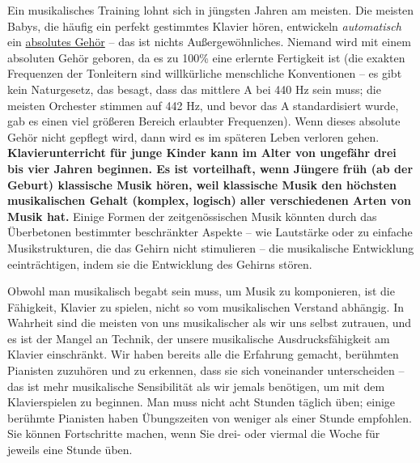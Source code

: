 Ein musikalisches Training lohnt sich in jüngsten Jahren am meisten.
Die meisten Babys, die häufig ein perfekt gestimmtes Klavier hören, entwickeln \textit{automatisch} ein \hyperref[c1iii12]{absolutes Gehör} -- das ist nichts Außergewöhnliches.
Niemand wird mit einem absoluten Gehör geboren, da es zu 100\% eine erlernte Fertigkeit ist (die exakten Frequenzen der Tonleitern sind willkürliche menschliche Konventionen -- es gibt kein Naturgesetz, das besagt, dass das mittlere A bei 440 Hz sein muss; die meisten Orchester stimmen auf 442 Hz, und bevor das A standardisiert wurde, gab es einen viel größeren Bereich erlaubter Frequenzen).
Wenn dieses absolute Gehör nicht gepflegt wird, dann wird es im späteren Leben verloren gehen.
\textbf{Klavierunterricht für junge Kinder kann im Alter von ungefähr drei bis vier Jahren beginnen.
Es ist vorteilhaft, wenn Jüngere früh (ab der Geburt) klassische Musik hören, weil klassische Musik den höchsten musikalischen Gehalt (komplex, logisch) aller verschiedenen Arten von Musik hat.}
Einige Formen der zeitgenössischen Musik könnten durch das Überbetonen bestimmter beschränkter Aspekte -- wie Lautstärke oder zu einfache Musikstrukturen, die das Gehirn nicht stimulieren -- die musikalische Entwicklung eeinträchtigen, indem sie die Entwicklung des Gehirns stören.

Obwohl man musikalisch begabt sein muss, um Musik zu komponieren, ist die Fähigkeit, Klavier zu spielen, nicht so vom musikalischen Verstand abhängig.
In Wahrheit sind die meisten von uns musikalischer als wir uns selbst zutrauen, und es ist der Mangel an Technik, der unsere musikalische Ausdrucksfähigkeit am Klavier einschränkt.
Wir haben bereits alle die Erfahrung gemacht, berühmten Pianisten zuzuhören und zu erkennen, dass sie sich voneinander unterscheiden -- das ist mehr musikalische Sensibilität als wir jemals benötigen, um mit dem Klavierspielen zu beginnen.
Man muss nicht acht Stunden täglich üben; einige berühmte Pianisten haben Übungszeiten von weniger als einer Stunde empfohlen.
Sie können Fortschritte machen, wenn Sie drei- oder viermal die Woche für jeweils eine Stunde üben.

